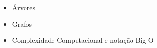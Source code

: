 \documentclass[a4paper,12pt]{article}
\begin{document}
\begin{itemize}
    \item Árvores
    \item Grafos 
    \item Complexidade Computacional e notação Big-O
\end{itemize}




\end{document}
